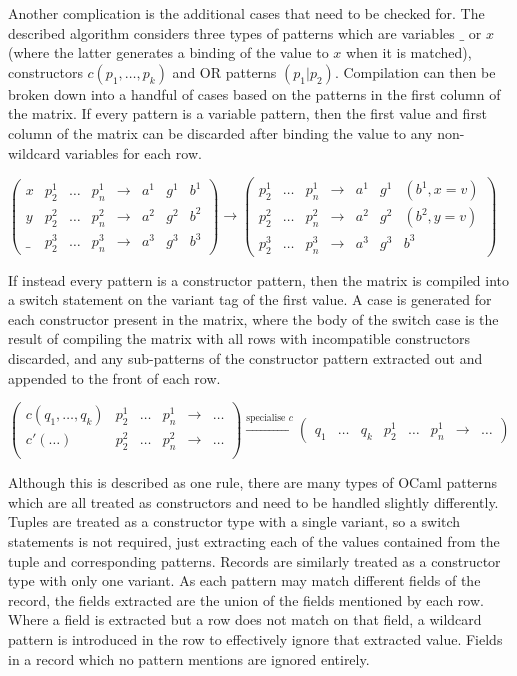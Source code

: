 Another complication is the additional cases that need to be checked for. The described algorithm considers three types of patterns which are variables $\_$ or $x$ (where the latter generates a binding of the value to $x$ when it is matched), constructors $c(p_1, \dots, p_k)$ and OR patterns $(p_1 | p_2)$. Compilation can then be broken down into a handful of cases based on the patterns in the first column of the matrix. If every pattern is a variable pattern, then the first value and first column of the matrix can be discarded after binding the value to any non-wildcard variables for each row. 

$
\begin{pmatrix}
x & p^1_2 & \dots & p^1_n & \to & a^1 & g^1 & b^1 \\
y & p^2_2 & \dots & p^2_n & \to & a^2 & g^2 & b^2 \\
\_ & p^3_2 & \dots & p^3_n & \to & a^3 & g^3 & b^3
\end{pmatrix}
\to
\begin{pmatrix}
 p^1_2 & \dots & p^1_n  & \to & a^1 & g^1 & (b^1, x=v) \\
 p^2_2 & \dots & p^2_n  & \to & a^2 & g^2 & (b^2, y=v) \\
 p^3_2 & \dots & p^3_n  & \to & a^3 & g^3 & b^3
\end{pmatrix}
$

If instead every pattern is a constructor pattern, then the matrix is compiled into a switch statement on the variant tag of the first value. A case is generated for each constructor present in the matrix, where the body of the switch case is the result of compiling the matrix with all rows with incompatible constructors discarded, and any sub-patterns of the constructor pattern extracted out and appended to the front of each row. 

$
\begin{pmatrix}
c(q_1, \dots, q_k) & p^1_2 & \dots & p^1_n & \to & \dots \\
c'(\dots) & p^2_2 & \dots & p^2_n & \to & \dots \\
\end{pmatrix}
\xrightarrow{\text{specialise } c}
\begin{pmatrix}
 q_1 & \dots & q_k & p^1_2 & \dots & p^1_n  & \to & \dots 
\end{pmatrix}
$

Although this is described as one rule, there are many types of OCaml patterns which are all treated as constructors and need to be handled slightly differently. Tuples are treated as a constructor type with a single variant, so a switch statements is not required, just extracting each of the values contained from the tuple and corresponding patterns. Records are similarly treated as a constructor type with only one variant. As each pattern may match different fields of the record, the fields extracted are the union of the fields mentioned by each row. Where a field is extracted but a row does not match on that field, a wildcard pattern is introduced in the row to effectively ignore that extracted value.  Fields in a record which no pattern mentions are ignored entirely.

